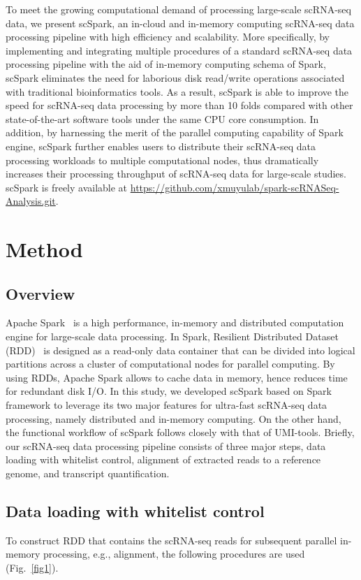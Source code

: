 \documentclass[conference]{IEEEtran}
\begin{document}
To meet the growing computational demand of processing large-scale scRNA-seq data, we present scSpark, an in-cloud and in-memory computing scRNA-seq data processing pipeline with high efficiency and scalability. 
More specifically, by implementing and integrating multiple procedures of a standard scRNA-seq data processing pipeline with the aid of in-memory computing schema of Spark, scSpark eliminates the need for laborious disk read/write operations associated with traditional bioinformatics tools. 
As a result, scSpark is able to improve the speed for scRNA-seq data processing by more than 10 folds compared with other state-of-the-art software tools under the same CPU core consumption. In addition, by harnessing the merit of the parallel computing capability of Spark engine, scSpark further enables users to distribute their scRNA-seq data processing workloads to multiple computational nodes, thus dramatically increases their processing throughput of scRNA-seq data for large-scale studies. 
scSpark is freely available at \url{https://github.com/xmuyulab/spark-scRNASeq-Analysis.git}.

\section{Method}
\subsection{Overview}
Apache Spark~\cite{zaharia2010spark} is a high performance, in-memory and distributed computation engine for large-scale data processing. 
In Spark, Resilient Distributed Dataset (RDD)~\cite{Zaharia2012Resilient} is designed as a read-only data container that can be divided into logical partitions across a cluster of computational nodes for parallel computing. 
By using RDDs, Apache Spark allows to cache data in memory, hence reduces time for redundant disk I/O.
In this study, we developed scSpark based on Spark framework to leverage its two major features for ultra-fast scRNA-seq data processing, namely distributed and in-memory computing. 
On the other hand, the functional workflow of scSpark follows closely with that of UMI-tools.
Briefly, our scRNA-seq data processing pipeline consists of three major steps, data loading with whitelist control, alignment of extracted reads to a reference genome, and transcript quantification. 

\subsection{Data loading with whitelist control}
To construct RDD that contains the scRNA-seq reads for subsequent parallel in-memory processing, e.g., alignment, the following procedures are used (Fig.~\ref{fig1}).
\end{document}
